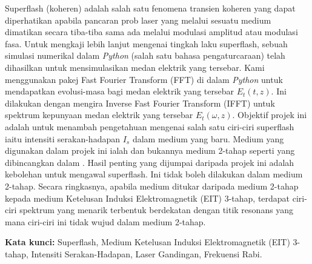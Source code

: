 
Superflash (koheren) adalah salah satu fenomena transien koheren yang dapat diperhatikan apabila pancaran prob laser yang melalui sesuatu medium dimatikan secara tiba-tiba sama ada melalui modulasi amplitud atau modulasi fasa. Untuk mengkaji lebih lanjut mengenai tingkah laku superflash, sebuah simulasi numerikal dalam \textit{Python} (salah satu bahasa pengaturcaraan) telah dihasilkan untuk mensimulasikan medan elektrik yang tersebar. Kami menggunakan pakej Fast Fourier Transform (FFT) di dalam \textit{Python} untuk mendapatkan evolusi-masa bagi medan elektrik yang tersebar $E_{t}(t, z)$. Ini dilakukan dengan mengira Inverse Fast Fourier Transform (IFFT) untuk spektrum kepunyaan medan elektrik yang tersebar $E_{t}(\omega, z)$. Objektif projek ini adalah untuk menambah pengetahuan mengenai salah satu ciri-ciri superflash iaitu intensiti serakan-hadapan $I_{s}$ dalam medium yang baru. Medium yang digunakan dalam projek ini ialah  dan bukannya medium 2-tahap seperti yang dibincangkan dalam \cite{Kwong2014}. Hasil penting yang dijumpai daripada projek ini adalah kebolehan untuk mengawal superflash. Ini tidak boleh dilakukan dalam medium 2-tahap. Secara ringkasnya, apabila medium ditukar daripada medium 2-tahap kepada medium Ketelusan Induksi Elektromagnetik (EIT) 3-tahap, terdapat ciri-ciri spektrum yang menarik terbentuk berdekatan dengan titik resonans yang mana ciri-ciri ini tidak wujud dalam medium 2-tahap.

\textbf{Kata kunci:} Superflash, Medium Ketelusan Induksi Elektromagnetik (EIT) 3-tahap, Intensiti Serakan-Hadapan, Laser Gandingan, Frekuensi Rabi.
